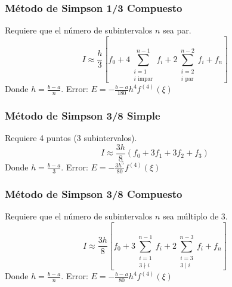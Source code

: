 \subsubsection{Método de Simpson 1/3 Compuesto}
Requiere que el número de subintervalos $n$ sea par.
\begin{equation}
    I \approx \frac{h}{3} \left[ f_0 + 4 \sum_{\substack{i=1 \\ i \text{ impar}}}^{n-1} f_i + 2 \sum_{\substack{i=2 \\ i \text{ par}}}^{n-2} f_i + f_n \right]
\end{equation}
Donde $h = \frac{b - a}{n}$.
Error: $E = -\frac{b - a}{180} h^4 f^{(4)}(\xi)$

\subsubsection{Método de Simpson 3/8 Simple}
Requiere 4 puntos (3 subintervalos).
\begin{equation}
    I \approx \frac{3h}{8} (f_0 + 3f_1 + 3f_2 + f_3)
\end{equation}
Donde $h = \frac{b - a}{3}$.
Error: $E = -\frac{3h^5}{80} f^{(4)}(\xi)$

\subsubsection{Método de Simpson 3/8 Compuesto}
Requiere que el número de subintervalos $n$ sea múltiplo de 3.
\begin{equation}
    I \approx \frac{3h}{8} \left[ f_0 + 3 \sum_{\substack{i=1 \\ 3 \nmid i}}^{n-1} f_i + 2 \sum_{\substack{i=3 \\ 3 \mid i}}^{n-3} f_i + f_n \right]
\end{equation}
Donde $h = \frac{b - a}{n}$.
Error: $E = -\frac{b - a}{80} h^4 f^{(4)}(\xi)$